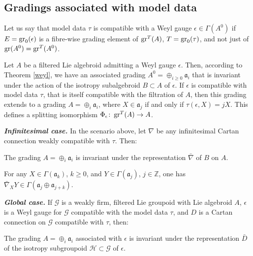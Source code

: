 \documentclass[leqno,12pt]{amsart} %
\begin{document}
\subsection{Gradings associated with model data}\label{model_data_gradings}

Let us say that model data $\tau$ is {\df compatible} with a Weyl gauge
$\epsilon \in \Gamma(A^0)$ if $E = \operatorname{\operatorname{gr}}_0(\epsilon)$ is a fibre-wise grading element of
$\operatorname{\operatorname{gr}}^T(A)$, $T=\operatorname{\operatorname{gr}}_0(\tau)$, and not just of $\operatorname{\operatorname{gr}}(A^0)=\operatorname{\operatorname{gr}}^T(A^0)$.

Let $A$ be a filtered Lie algebroid admitting a Weyl gauge $\epsilon$. Then, according to
Theorem \ref{weyl}, we have an associated grading $A^0=\oplus_{i\ge 0}{\mathfrak a}_i$
that is invariant under the action of the isotropy subalgebroid $B \subset A$ of
$\epsilon$. If $\epsilon$ is compatible with model data $\tau$, that is itself compatible
with the filtration of $A$, then this grading extends to a grading
$A = \oplus_i {\mathfrak a}_i $, where $X \in {\mathfrak a}_j$ if and only if
$\tau(\epsilon, X) = jX$. This defines a splitting isomorphism
$\Phi_\epsilon \colon \operatorname{\operatorname{gr}}^T(A) \rightarrow A$.

\begin{proposition} {\em \bfseries Infinitesimal case.} In the scenario above, let $\nabla $ be any
  infinitesimal Cartan connection weakly compatible with $\tau $. Then:
  \begin{conditions}
  \item The grading $A = \oplus_i {\mathfrak a}_i$ is invariant under the representation
    $\bar\nabla $ of $B$ on $A$.    \label{u4}
  \item For any $X \in \Gamma({\mathfrak a}_k)$, $k\ge 0$, and
    $Y \in \Gamma({\mathfrak a}_j)$, $j \in {\mathbb Z} $, one has
    $\bar\nabla_XY \in \Gamma({\mathfrak a}_j \oplus {\mathfrak a}_{j+k})$.\label{u3}
  \end{conditions}
  {\em\bfseries Global case.} If ${\mathcal G} $ is a weakly firm, filtered Lie groupoid with Lie
  algebroid $A$, $\epsilon$ is a Weyl gauge for ${\mathcal G} $ compatible with the model data
  $\tau $, and $D$ is a Cartan connection on ${\mathcal G} $ compatible with $\tau $,
  then:
  \begin{conditions}
  \item The grading $A=\oplus_i {\mathfrak a}_i$ associated with $\epsilon$ is invariant under
    the representation $\bar D $ of the isotropy subgroupoid
    ${\mathcal H}\subset {\mathcal G} $ of $\epsilon$.\label{uu4}
  \end{conditions}
\end{proposition}
\end{document}
